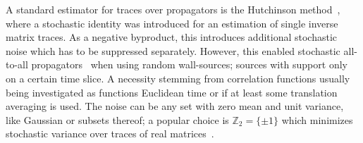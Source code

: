 
A standard estimator for traces over propagators is the Hutchinson method~\cite{Hutchinson01011990}, where a stochastic identity was introduced for an estimation of single inverse matrix traces.
As a negative byproduct, this introduces additional stochastic noise which has to be suppressed separately.
However, this enabled stochastic all-to-all propagators~\cite{Foley:2005ac} when using random wall-sources; sources with support only on a certain time slice.
A necessity stemming from correlation functions usually being investigated as functions Euclidean time or if at least some translation averaging is used.
The noise can be any set with zero mean and unit variance, like Gaussian or subsets thereof; a popular choice is $\mathbb{Z}_2 = \{\pm 1\}$ which minimizes stochastic variance over traces of real matrices~\cite{Bernardson:1993he}.

